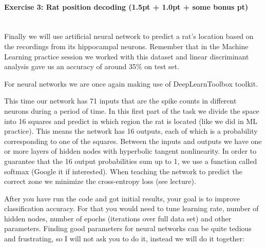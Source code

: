 \documentclass[a4paper,11pt]{article}
\newenvironment{exercise}[3]{\paragraph{Exercise #1: #2 (#3pt)}\ \\}{
\medskip}
\begin{document}
%
%
\begin{exercise}{3}{Rat position decoding}{1.5pt + 1.0pt + some bonus }

Finally we will use artificial neural network to predict a rat's location based on the recordings from its hippocampal neurons. Remember that in the Machine Learning practice session we worked with this dataset and linear discriminant analysis gave us an accuracy of around 35\% on test set. 

For neural networks we are once again making use of DeepLearnToolbox toolkit.

This time our network has 71 inputs that are the spike counts in different neurons during a period of time. In this first part of the task we divide the space into 16 squares and predict in which region the rat is located (like we did in ML practice). This means the network has 16 outputs, each of which is a probability corresponding to one of the squares. Between the inputs and outputs we have one or more layers of hidden nodes with hyperbolic tangent nonlinearity. In order to guarantee that the 16 output probabilities sum up to 1, we use a function called softmax (Google it if interested). When teaching the network to predict the correct zone we minimize the cross-entropy loss (see lecture).

After you have run the code and got initial results, your goal is to improve classification accuracy. For that you would need to tune learning rate, number of hidden nodes, number of epochs (iterations over full data set) and other parameters. Finding good parameters for neural networks can be quite tedious and frustrating, so I will not ask you to do it, instead we will do it together:


\end{exercise}
\end{document}
